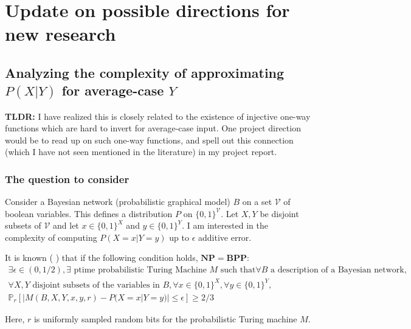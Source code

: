 \documentclass{article}
\newcommand{\NP}{\mathbf{NP}}
\newcommand{\BPP}{\mathbf{BPP}}
\begin{document}
\section{Update on possible directions for new research}

\subsection{Analyzing the complexity of approximating $P(X | Y)$ for average-case $Y$}

\textbf{TLDR:} I have realized this is closely related to the existence of injective one-way functions which are hard to invert for average-case input.  One project direction would be to read up on such one-way functions, and spell out this connection (which I have not seen mentioned in the literature) in my project report.

\subsubsection{The question to consider}
Consider a Bayesian network (probabilistic graphical model) $B$ on a set $\mathcal{V}$ of boolean variables.  This defines a distribution $P$ on $\{0, 1\}^{\mathcal{V}}$.  Let $X, Y$ be disjoint subsets of $\mathcal{V}$ and let $x \in \{0, 1\}^X$ and $y \in \{0, 1\}^Y$.  I am interested in the complexity of computing $P(X = x | Y = y)$ up to $\epsilon$ additive error.

It is known (\citeauthor{dagum1993} \citeyear{dagum1993}) that if the following condition holds, $\NP = \BPP$:
\begin{multline}
    \exists \epsilon \in (0, 1/2),
    \exists \text{ ptime probabilistic Turing Machine } M \text{ such that} \forall B \text{ a description of a Bayesian network, } \\
    \forall X, Y \text{ disjoint subsets of the variables in } B, \forall x \in \{0, 1\}^X, \forall y \in \{0, 1\}^Y, \\
    \mathbb{P}_{r}[|M(B, X, Y, x, y, r) - P(X = x | Y = y)| \leq \epsilon] \geq 2/3
\end{multline}

Here, $r$ is uniformly sampled random bits for the probabilistic Turing machine $M$.
\end{document}
